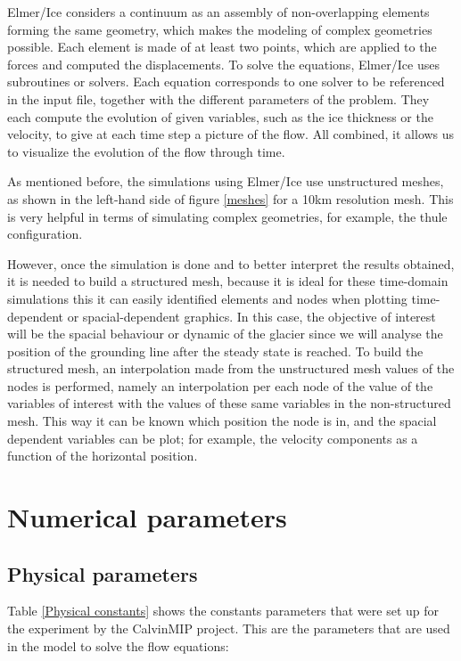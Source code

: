 \documentclass{article}
\begin{document}
Elmer/Ice considers a continuum as an assembly of non-overlapping elements forming the same geometry, which makes the modeling of complex geometries possible. Each element is made of at least two points, which are applied to the forces and computed the displacements. To solve the equations, Elmer/Ice uses subroutines or solvers. Each equation corresponds to one solver to be referenced in the input file, together with the different parameters of the problem. They each compute the evolution of given variables, such as the ice thickness or the velocity, to give at each time step a picture of the flow. All combined, it allows us to visualize the evolution of the flow through time.

As mentioned before, the simulations using Elmer/Ice use unstructured meshes, as shown in the left-hand side of figure \ref{meshes} for a 10km resolution mesh. This is very helpful in terms of simulating complex geometries, for example, the thule configuration.


However, once the simulation is done and to better interpret the results obtained, it is needed to build a structured mesh, because it is ideal for these time-domain simulations this it can  easily identified elements and nodes when plotting time-dependent or spacial-dependent graphics. In this case, the objective of interest will be the spacial behaviour or dynamic of the glacier since we will analyse the position of the grounding line after the steady state is reached. To build the structured mesh, an interpolation made from the unstructured mesh values of the nodes is performed, namely an interpolation per each node of the value of the variables of interest with the values of these same variables in the non-structured mesh. This way it can be known which position the node is in, and the spacial dependent variables can be plot; for example, the velocity components as a function of the horizontal position. 

\section{Numerical parameters}

\subsection{Physical parameters}
Table \ref{Physical constants} shows the constants parameters that were set up for the experiment by the CalvinMIP project. This are the parameters that are used in the model to solve the flow equations:
\end{document}
